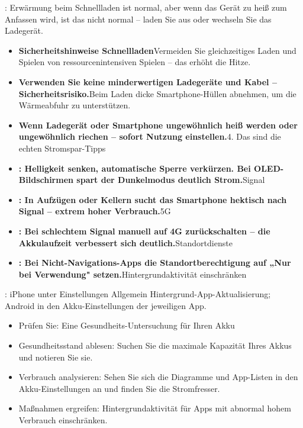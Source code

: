 
: Erwärmung beim Schnellladen ist normal, aber wenn das Gerät zu heiß zum Anfassen wird, ist das nicht normal – laden Sie aus oder wechseln Sie das Ladegerät.

\begin{itemize}
  \item \textbf{Sicherheitshinweise Schnellladen}Vermeiden Sie gleichzeitiges Laden und Spielen von ressourcenintensiven Spielen – das erhöht die Hitze.
  \item \textbf{Verwenden Sie keine minderwertigen Ladegeräte und Kabel – Sicherheitsrisiko.}Beim Laden dicke Smartphone-Hüllen abnehmen, um die Wärmeabfuhr zu unterstützen.
  \item \textbf{Wenn Ladegerät oder Smartphone ungewöhnlich heiß werden oder ungewöhnlich riechen – sofort Nutzung einstellen.}4. Das sind die echten Stromspar-Tipps
\end{itemize}


\begin{itemize}
  \item \textbf{: Helligkeit senken, automatische Sperre verkürzen. Bei OLED-Bildschirmen spart der Dunkelmodus deutlich Strom.}Signal
  \item \textbf{: In Aufzügen oder Kellern sucht das Smartphone hektisch nach Signal – extrem hoher Verbrauch.}5G
  \item \textbf{: Bei schlechtem Signal manuell auf 4G zurückschalten – die Akkulaufzeit verbessert sich deutlich.}Standortdienste
  \item \textbf{: Bei Nicht-Navigations-Apps die Standortberechtigung auf „Nur bei Verwendung" setzen.}Hintergrundaktivität einschränken
\end{itemize}

\begin{tcbwarn}{: iPhone unter Einstellungen Allgemein Hintergrund-App-Aktualisierung; Android in den Akku-Einstellungen der jeweiligen App.}
\begin{itemize}
  \item Prüfen Sie: Eine Gesundheits-Untersuchung für Ihren Akku
  \item Gesundheitsstand ablesen: Suchen Sie die maximale Kapazität Ihres Akkus und notieren Sie sie.
  \item Verbrauch analysieren: Sehen Sie sich die Diagramme und App-Listen in den Akku-Einstellungen an und finden Sie die Stromfresser.
  \item Maßnahmen ergreifen: Hintergrundaktivität für Apps mit abnormal hohem Verbrauch einschränken.
\end{itemize}

\end{tcbwarn}

